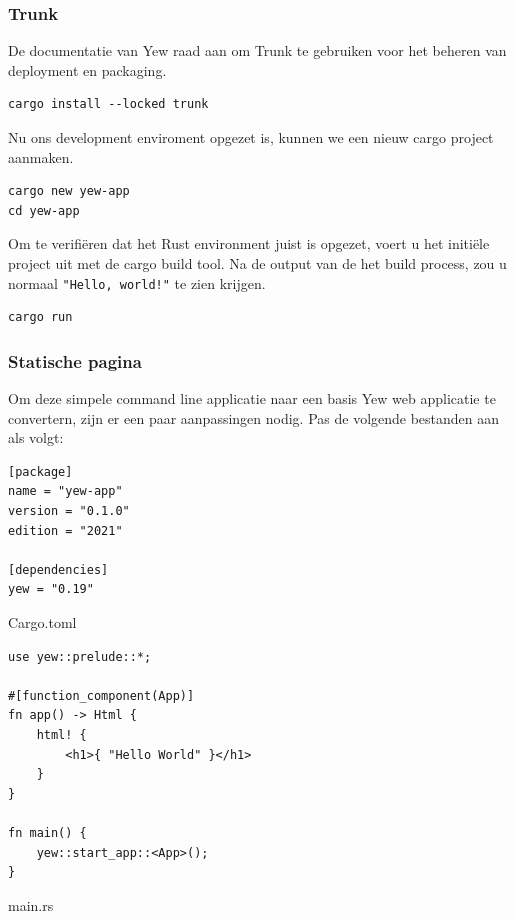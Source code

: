\clearpage

\subsubsection{Trunk}

De documentatie van Yew raad aan om Trunk te gebruiken voor het beheren van deployment en packaging.

\begin{verbatim}
cargo install --locked trunk
\end{verbatim}

Nu ons development enviroment opgezet is, kunnen we een nieuw cargo project aanmaken.

\begin{verbatim}
cargo new yew-app
cd yew-app
\end{verbatim}

Om te verifiëren dat het Rust environment juist is opgezet, voert u het initiële project uit met de
cargo build tool. Na de output van de het build process, zou u normaal \texttt{"Hello,
world!"} te zien
krijgen.

\begin{verbatim}
cargo run
\end{verbatim}

\subsubsection{Statische pagina}

Om deze simpele command line applicatie naar een basis Yew web applicatie te convertern, zijn er een
paar aanpassingen nodig. Pas de volgende bestanden aan als volgt:

\begin{listing}[h]
\begin{verbatim}
[package]
name = "yew-app"
version = "0.1.0"
edition = "2021"

[dependencies]
yew = "0.19"
\end{verbatim}
\caption{Cargo.toml}
\end{listing}

\clearpage

\begin{listing}[h]
\begin{verbatim}
use yew::prelude::*;

#[function_component(App)]
fn app() -> Html {
    html! {
        <h1>{ "Hello World" }</h1>
    }
}

fn main() {
    yew::start_app::<App>();
}
\end{verbatim}
\caption{main.rs}
\end{listing}

